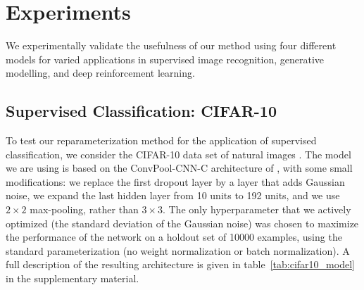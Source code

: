 \documentclass{article}
\begin{document}
\section{Experiments}
\label{sec:experiments}
We experimentally validate the usefulness of our method using four different models for varied applications in supervised image recognition, generative modelling, and deep reinforcement learning.

\subsection{Supervised Classification: CIFAR-10}
\label{subsec:cifar10}
To test our reparameterization method for the application of supervised classification, we consider the CIFAR-10 data set of natural images \cite{krizhevsky2009learning}. The model we are using is based on the ConvPool-CNN-C architecture of \cite{springenberg2014striving}, with some small modifications: we replace the first dropout layer by a layer that adds Gaussian noise, we expand the last hidden layer from 10 units to 192 units, and we use $2 \times 2$ max-pooling, rather than $3 \times 3$. The only hyperparameter that we actively optimized (the standard deviation of the Gaussian noise) was chosen to maximize the performance of the network on a holdout set of 10000 examples, using the standard parameterization (no weight normalization or batch normalization). A full description of the resulting architecture is given in table~\ref{tab:cifar10_model} in the supplementary material.
\end{document}
